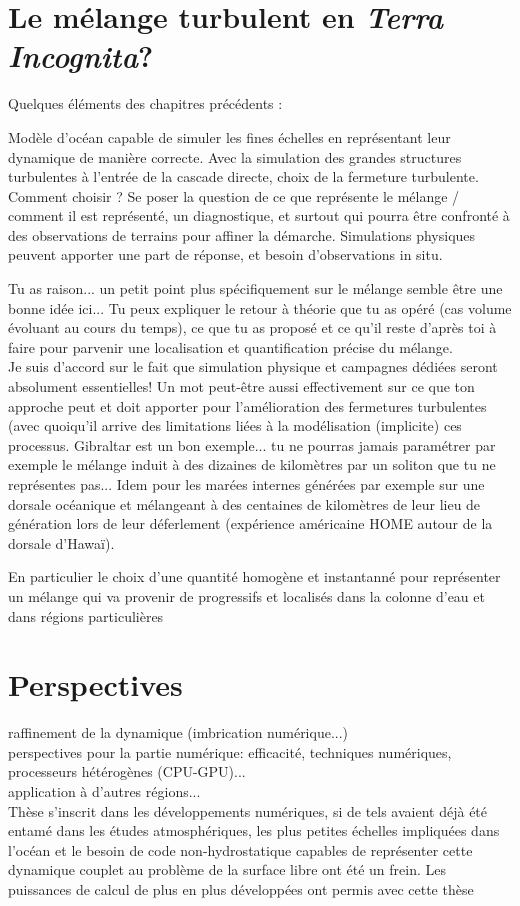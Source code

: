 \section{Le mélange turbulent en \textit{Terra Incognita}?}
Quelques éléments des chapitres précédents :

Modèle d'océan capable de simuler les fines échelles en représentant leur dynamique de manière correcte. Avec la simulation des grandes structures turbulentes à l'entrée de la cascade directe, choix de la fermeture turbulente. Comment choisir ? Se poser la question de ce que représente le mélange / comment il est représenté, un diagnostique, et surtout qui pourra être confronté à des observations de terrains pour affiner la démarche.
Simulations physiques peuvent apporter une part de réponse, et besoin d'observations in situ.

\color{red} Tu as raison... un petit point plus spécifiquement sur le mélange semble être une bonne idée ici... Tu peux expliquer le retour à théorie que tu as opéré (cas volume évoluant au cours du temps), ce que tu as proposé et ce qu'il reste d'après toi à faire pour parvenir une localisation et quantification précise du mélange.\\
Je suis d'accord sur le fait que simulation physique et campagnes dédiées seront absolument essentielles! Un mot peut-être aussi effectivement sur ce que ton approche peut et doit apporter pour l'amélioration des fermetures turbulentes (avec quoiqu'il arrive des limitations liées à la modélisation (implicite) ces processus. Gibraltar est un bon exemple... tu ne pourras jamais paramétrer par exemple le mélange induit à des dizaines de kilomètres par un soliton que tu ne représentes pas... Idem pour les marées internes générées par exemple sur une dorsale océanique et mélangeant à des centaines de kilomètres de leur lieu de génération lors de leur déferlement (expérience américaine HOME autour de la dorsale d'Hawaï).\\
\color{black}


En particulier le choix d'une quantité homogène et instantanné pour représenter un mélange qui va provenir de progressifs et localisés dans la colonne d'eau et dans régions particulières 

\section{Perspectives}

\color{blue}
raffinement de la dynamique (imbrication numérique...)\\
perspectives pour la partie numérique: efficacité, techniques numériques, processeurs hétérogènes (CPU-GPU)...\\
application à d'autres régions...\\
\color{black}
Thèse s'inscrit dans les développements numériques, si de tels avaient déjà été entamé dans les études atmosphériques, les plus petites échelles impliquées dans l'océan et le besoin de code non-hydrostatique capables de représenter cette dynamique couplet au problème de la surface libre ont été un frein. Les puissances de calcul de plus en plus développées ont permis avec cette thèse 

